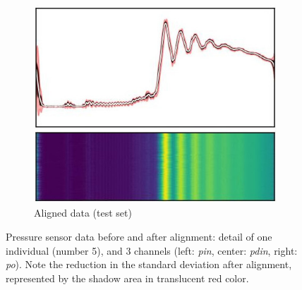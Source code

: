 \begin{figure}[!htb]
\begin{center}
\begin{subfigure}[t]{\linewidth}
            \includegraphics[width=0.32\linewidth]{figures/aligned/plot_heatmap_class_1_detail_3.jpg}
            \caption{Aligned data (test set)}
            \label{fig:phm_alignment_1b}
        \end{subfigure}
        \caption{Pressure sensor data before and after alignment: detail of one individual (number 5), and 3 channels (left: \textit{pin}, center: \textit{pdin}, right: \textit{po}). Note the reduction in the standard deviation after alignment, represented by the shadow area in translucent red color.}
    \label{fig:phm_alignment_1}
    \end{center}
\end{figure}

